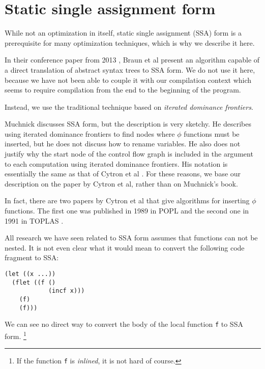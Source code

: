 \section{Static single assignment form}
\label{mir-optimizations-ssa-form}

While not an optimization in itself, static single assignment (SSA)
form is a prerequisite for many optimization techniques, which is why
we describe it here. 

In their conference paper from 2013
\cite{Braun:2013:SEC:2450247.2450258}, Braun et al present an
algorithm capable of a direct translation of abstract syntax trees to
SSA form.  We do not use it here, because we have not been able to
couple it with our compilation context which seems to require
compilation from the end to the beginning of the program. 

Instead, we use the traditional technique based on \emph{iterated
  dominance frontiers}.

Muchnick \cite{Muchnick:1998:ACD:286076} discusses SSA form, but the
description is very sketchy.  He describes using iterated dominance
frontiers to find nodes where $\phi$ functions must be inserted, but
he does not discuss how to rename variables.  He also does not justify
why the start node of the control flow graph is included in the
argument to each computation using iterated dominance frontiers.  His
notation is essentially the same as that of Cytron et al
\cite{Cytron:1991:ECS:115372.115320}.  For these reasons, we base our
description on the paper by Cytron et al, rather than on Muchnick's
book.

In fact, there are two papers by Cytron et al that give algorithms for
inserting $\phi$ functions.  The first one was published in 1989 in
POPL \cite{Cytron:1989:EMC:75277.75280} and the second one in 1991 in
TOPLAS \cite{Cytron:1991:ECS:115372.115320}.

All research we have seen related to SSA form assumes that functions
can not be nested.  It is not even clear what it would mean to convert
the following code fragment to SSA:

\begin{verbatim}
(let ((x ...))
  (flet ((f ()
            (incf x)))
    (f)
    (f)))
\end{verbatim}

We can see no direct way to convert the body of the local function
\texttt{f} to SSA form.%
\footnote{If the function \texttt{f} is \emph{inlined}, it is not hard
  of course.}

